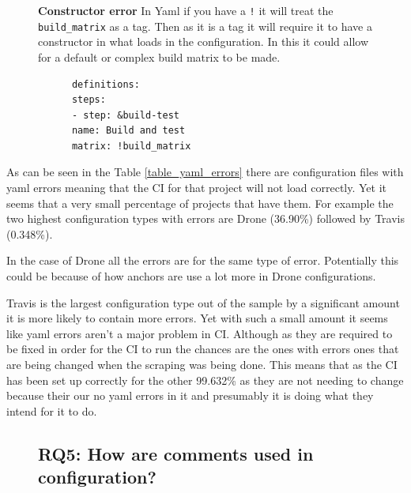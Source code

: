 \documentclass[10pt,conference]{IEEEtran}
\begin{document}
\begin{figure}[!ht]
  \centering
  \begin{minipage}[t]{.48\textwidth}
    \textbf{Constructor error}
    In Yaml if you have a \verb|!| it will treat the \verb|build_matrix| as a tag. Then as it is a tag it will require it to have a constructor in what loads in the configuration. In this it could allow for a default or complex build matrix to be made.
  \end{minipage}%
  \hfill
  \begin{minipage}[t]{.48\textwidth}
    \begin{verbatim}
      definitions: 
      steps:
      - step: &build-test
      name: Build and test
      matrix: !build_matrix
    \end{verbatim}
  \end{minipage}
\end{figure}




As can be seen in the Table \ref{table_yaml_errors} there are configuration files with yaml errors meaning that the CI for that project will not load correctly. Yet it seems that a very small percentage of projects that have them. For example the two highest configuration types with errors are Drone (36.90\%) followed by Travis (0.348\%).

In the case of Drone all the errors are for the same type of error. Potentially this could be because of how anchors are use a lot more in Drone configurations.

Travis is the largest configuration type out of the sample by a significant amount it is more likely to contain more errors. Yet with such a small amount it seems like yaml errors aren't a major problem in CI. Although as they are required to be fixed in order for the CI to run the chances are the ones with errors ones that are being changed when the scraping was being done. This means that as the CI has been set up correctly for the other 99.632\% as they are not needing to change because their our no yaml errors in it and presumably it is doing what they intend for it to do.


\pagebreak


\begin{figure}[!ht]
  \vspace*{-0.05in}
  \subsection{\textbf{RQ5}: How are comments used in configuration?}
  \label{section:RQ5}
  \vspace*{-0.05in}
\end{figure}
\end{document}
